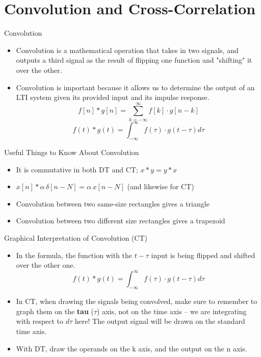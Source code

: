 \section{Convolution and Cross-Correlation}

\begin{frame}{Convolution}
    \begin{itemize}
        \item Convolution is a mathematical operation that takes in two signals, and outputs a third signal as the result of flipping one function and "shifting" it over the other. 

        \item Convolution is important because it allows us to determine the output of an LTI system given its provided input and its impulse response. 
            \[
                f[n]*g[n] = \sum_{k=-\infty}^{\infty} f[k]\cdot g[n-k]
            \]
            \[
                f(t)*g(t) = \int_{-\infty}^{\infty} f(\tau) \cdot g(t- \tau) d\tau
            \]
    \end{itemize}
\end{frame}
\begin{frame}{Useful Things to Know About Convolution}
    \begin{itemize}
        \item It is commutative in both DT and CT; $x*y = y*x$ 
        \item $x[n] * \alpha\,\delta[n-N] = \alpha\, x[n-N]$ (and likewise for CT)
        \item Convolution between two same-size rectangles gives a triangle
        \item Convolution between two different size rectangles gives a trapezoid
    \end{itemize}
\end{frame}
\begin{frame}{Graphical Interpretation of Convolution (CT)}
    \begin{itemize}
        \item In the formula, the function with the $t-\tau$ input is being flipped and shifted over the other one.
            \[
                f(t)*g(t) = \int_{-\infty}^{\infty} f(\tau) \cdot g(t- \tau) d\tau
            \]
        \item In CT, when drawing the signals being convolved, make sure to remember to graph them on the \textbf{tau} ($\tau$) axis, not on the time axis -- we are integrating with respect to $d\tau$ here! The output signal will be drawn on the standard time axis. 
        \item With DT, draw the operands on the k axis, and the output on the n axis. 
    \end{itemize}
\end{frame}
